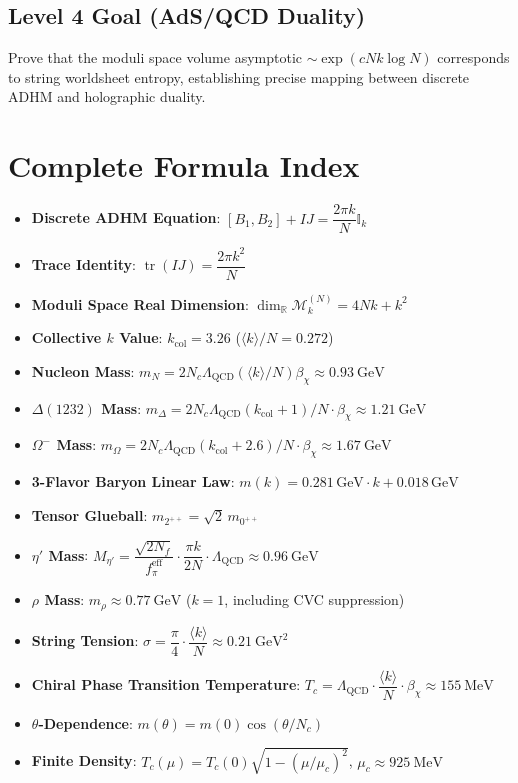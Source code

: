 \documentclass[12pt,a4paper]{amsart}
\theoremstyle{plain}
\theoremstyle{definition}
\theoremstyle{remark}
\DeclareMathOperator{\tr}{tr}
\DeclareMathOperator{\QCD}{QCD}
\begin{document}
\subsection{Level 4 Goal (AdS/QCD Duality)}
Prove that the moduli space volume asymptotic $\sim\exp(cNk\log N)$ corresponds to string worldsheet entropy, establishing precise mapping between discrete ADHM and holographic duality.

\appendix

\section{Complete Formula Index}\label{app:formula}

\begin{itemize}
\item \textbf{Discrete ADHM Equation}: $[B_1,B_2]+IJ = \dfrac{2\pi k}{N}\mathbb{I}_k$
\item \textbf{Trace Identity}: $\tr(IJ) = \dfrac{2\pi k^2}{N}$
\item \textbf{Moduli Space Real Dimension}: $\dim_{\mathbb{R}}\mathcal{M}_k^{(N)} = 4Nk + k^2$
\item \textbf{Collective $k$ Value}: $k_{\text{col}} = 3.26$ ($\langle k\rangle/N = 0.272$)
\item \textbf{Nucleon Mass}: $m_N = 2N_c\Lambda_{\QCD}(\langle k\rangle/N)\beta_{\chi} \approx 0.93\ \text{GeV}$
\item \textbf{$\Delta(1232)$ Mass}: $m_{\Delta} = 2N_c\Lambda_{\QCD}(k_{\text{col}}+1)/N \cdot \beta_{\chi} \approx 1.21\ \text{GeV}$
\item \textbf{$\Omega^-$ Mass}: $m_{\Omega} = 2N_c\Lambda_{\QCD}(k_{\text{col}}+2.6)/N \cdot \beta_{\chi} \approx 1.67\ \text{GeV}$
\item \textbf{3-Flavor Baryon Linear Law}: $m(k) = 0.281\,\text{GeV}\cdot k + 0.018\,\text{GeV}$
\item \textbf{Tensor Glueball}: $m_{2^{++}} = \sqrt{2}\,m_{0^{++}}$
\item \textbf{$\eta'$ Mass}: $M_{\eta'} = \dfrac{\sqrt{2N_f}}{f_\pi^{\text{eff}}} \cdot \dfrac{\pi k}{2N} \cdot \Lambda_{\QCD} \approx 0.96\ \text{GeV}$
\item \textbf{$\rho$ Mass}: $m_{\rho} \approx 0.77\ \text{GeV}$ ($k=1$, including CVC suppression)
\item \textbf{String Tension}: $\sigma = \dfrac{\pi}{4}\cdot\dfrac{\langle k \rangle}{N} \approx 0.21\ \text{GeV}^2$
\item \textbf{Chiral Phase Transition Temperature}: $T_c = \Lambda_{\QCD}\cdot\dfrac{\langle k \rangle}{N}\cdot\beta_{\chi} \approx 155\ \text{MeV}$
\item \textbf{$\theta$-Dependence}: $m(\theta) = m(0)\cos(\theta/N_c)$
\item \textbf{Finite Density}: $T_c(\mu) = T_c(0)\sqrt{1-(\mu/\mu_c)^2}$, $\mu_c\approx 925\ \text{MeV}$
\end{itemize}
\end{document}
